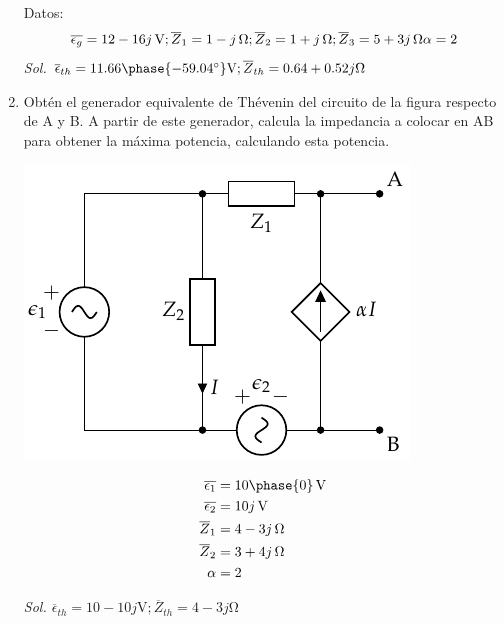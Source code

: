 \begin{enumerate}
Datos:
\begin{equation*}
  \overline{\epsilon_g} = \qty[parse-numbers=false]{12 - 16j}{\volt};
  \overline{Z}_1 = \qty[parse-numbers=false]{1 - j}{\ohm};
  \overline{Z}_2 = \qty[parse-numbers=false]{1 + j}{\ohm};
  \overline{Z}_3 = \qty[parse-numbers=false]{5 + 3j}{\ohm}
  \alpha = 2
\end{equation*}
\emph{Sol.
  $ \overline{\epsilon}_{th} = 11.66\phase{\ang{-59.04}}\unit{\volt};
  \overline{Z}_{th} = 0.64 + 0.52j\si{\ohm}$}

\item Obtén el generador equivalente de Thévenin del circuito de la figura respecto de A y B. A partir de este generador, calcula la impedancia a colocar en AB para obtener la máxima potencia, calculando esta potencia.

\begin{minipage}{0.5\textwidth}
\begin{center}
\includegraphics{../figs/Thevenin5}
\end{center}
\end{minipage}
\begin{minipage}{0.5\textwidth}
  \begin{align*}
    \overline{\epsilon_1} &= \SI[parse-numbers=false]{10\phase{0}}{\volt}\\
    \overline{\epsilon_2} &= \SI[parse-numbers=false]{10j}{\volt}\\
    \overline{Z}_1 &= \SI[parse-numbers=false]{4 - 3j}{\ohm}\\
    \overline{Z}_2 &= \SI[parse-numbers=false]{3 + 4j}{\ohm}\\
    \alpha &= 2
  \end{align*}
\end{minipage}

\emph{Sol. $
  \overline{\epsilon}_{th} =  10 - 10j \unit{\volt};
  \overline{Z}_{th} = 4 - 3j \unit{\ohm}
  $}

\end{enumerate}
